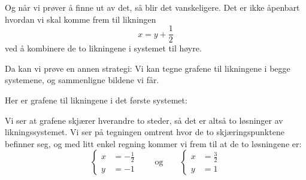 \begin{losning}
Og når vi prøver å finne ut av det, så blir det vanskeligere.  Det er
ikke åpenbart hvordan vi skal komme frem til likningen
\[
x = y + \frac{1}{2}
\]
ved å kombinere de to likningene i systemet til høyre.

Da kan vi prøve en annen strategi: Vi kan tegne grafene til likningene
i begge systemene, og sammenligne bildene vi får.

Her er grafene til likningene i det første systemet:
\begin{center}
\end{center}
Vi ser at grafene skjærer hverandre to steder, så det er altså to
løsninger av likningssystemet.  Vi ser på tegningen omtrent hvor de to
skjæringspunktene befinner seg, og med litt enkel regning kommer vi
frem til at de to løsningene er:
\[
\left\{
\begin{aligned}
x &= -\frac{1}{2} \\
y &= -1
\end{aligned}
\right.
\qquad\text{og}\qquad
\left\{
\begin{aligned}
x &= \frac{3}{2} \\
y &= 1
\end{aligned}
\right.
\]


\end{losning}
